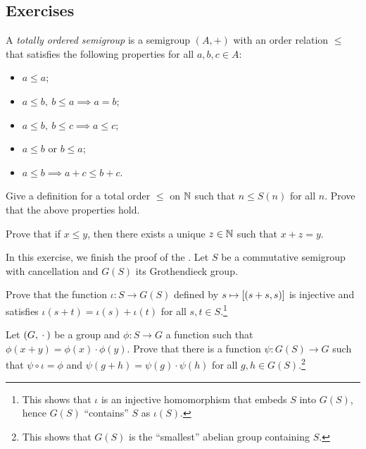\documentclass[master.tex]{subfiles}
\begin{document}
    \subsection*{Exercises}
    \begin{exercises}
        \item A \emph{totally ordered semigroup} is a semigroup $(A, +)$ with an order relation $\leq$ that satisfies the following properties for all $a, b, c \in A$:
        \begin{itemize}
            \item $a \leq a$;
            \item $a \leq b, \ b \leq a \implies a = b$;
            \item $a \leq b, \ b \leq c \implies a \leq c$;
            \item $a \leq b$ or $b \leq a$;
            \item $a \leq b \implies a + c \leq b + c$.
        \end{itemize}
        \begin{exercises}
            \item Give a definition for a total order $\leq$ on $\mathbb{N}$ such that $n \leq S(n)$ for all $n$.
            Prove that the above properties hold.
            \item Prove that if $x \leq y$, then there exists a unique $z \in \mathbb{N}$ such that $x + z = y$.
        \end{exercises}

        \item In this exercise, we finish the proof of the .
        Let $S$ be a commutative semigroup with cancellation and $G(S)$ its Grothendieck group.
        \begin{exercises}
            \item Prove that the function $\iota : S \rightarrow G(S)$ defined by $s \mapsto \left[ (s + s, s) \right]$ is injective and satisfies $\iota(s + t) = \iota(s) + \iota(t)$ for all $s, t \in S$.\footnote{
                This shows that $\iota$ is an injective homomorphism that embeds $S$ into $G(S)$, hence $G(S)$ ``contains'' $S$ as $\iota(S)$.
            }
            \item Let $(G, {}\cdot{}{})$ be a group and $\phi : S \rightarrow G$ a function such that $\phi(x + y) = \phi(x) \cdot \phi(y)$.
            Prove that there is a function $\psi : G(S) \rightarrow G$ such that $\psi \circ \iota = \phi$ and $\psi(g + h) = \psi(g) \cdot \psi(h)$ for all $g, h \in G(S)$.\footnote{
                This shows that $G(S)$ is the ``smallest'' abelian group containing $S$.
            }
        \end{exercises}


\end{exercises}
\end{document}
